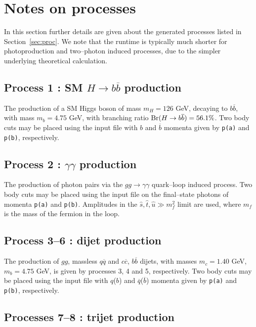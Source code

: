 \documentclass[12pt]{article}
\begin{document}
\section{Notes on processes}\label{sec:procnot}

In this section further details are given about the generated processes listed in Section~\ref{sec:proc}. We note that the runtime is typically 
much shorter for photoproduction and two--photon induced processes, due to the simpler underlying theoretical calculation.

\subsection{Process 1 : SM $H\to b\overline{b}$ production}

The production of a SM Higgs boson of mass $m_H=126$ GeV, decaying to $b\overline{b}$, with mass $m_b=4.75$ GeV, with branching ratio 
${\rm Br}(H\to b\overline{b})=56.1\%$. Two body cuts may be placed using the input file with $b$ and $\overline{b}$ momenta given by 
\texttt{p(a)} and \texttt{p(b)}, respectively.

\subsection{Process 2 : $\gamma\gamma$ production}

The production of photon pairs via the $gg\to\gamma\gamma$ quark--loop induced process. Two body cuts may be placed using the input file on the 
final--state photons of momenta  \texttt{p(a)} and \texttt{p(b)}.  Amplitudes in the $\hat{s},\hat{t},\hat{u} \gg m_f^2$ limit are used, where 
$m_f$ is the mass of the fermion in the loop.

\subsection{Process 3--6 : dijet production}

The production of $gg$, massless $q\overline{q}$ and $c\overline{c}$, $b\overline{b}$ dijets, with masses $m_c=1.40$ GeV, $m_b=4.75$ GeV, is given
 by processes 3, 4 and 5, respectively. Two body cuts may be placed using the input file with $q$($b$) and $\overline{q}$($\overline{b}$) momenta 
 given by \texttt{p(a)} and \texttt{p(b)}, respectively.

\subsection{Processes 7--8 : trijet production}
\end{document}
